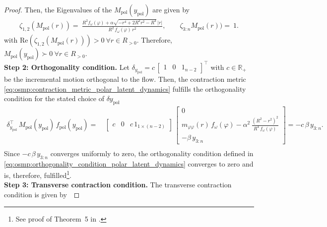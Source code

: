 \begin{proof}
    Then, the Eigenvalues of the $M_\mathrm{pol}(y_\mathrm{pol})$ are given by
    \begin{equation}
    \begin{split}
        \zeta_{1,2}(M_\mathrm{pol}(r)) =  \: \frac{R^2 f_\omega(\varphi) + \alpha \sqrt{- r^4 + 2R^2 r^2 -R^4 } \, |r|}{R^2 \, f_\omega(\varphi) \, r^2},
        \qquad
        \zeta_{3:n}M_\mathrm{pol}(r)) = \: 1.
    \end{split}
    \end{equation}
    with $\mathrm{Re}(\zeta_{1,2}(M_\mathrm{pol}(r))) > 0 \: \forall r \in R_{>0}$. Therefore, $M_\mathrm{pol}(y_\mathrm{pol}) \succ 0 \: \forall r \in R_{>0}$.
    \\
    \textbf{Step 2: Orthogonality condition.}
    Let $\delta_{y_\mathrm{pol}} = c \, \begin{bmatrix}
        1 & 0 & 1_{n-2}
    \end{bmatrix}^\top$ with $c \in \mathbb{R}_+$ be the incremental motion orthogonal to the flow. Then, the contraction metric \eqref{eq:osmp:contraction_metric_polar_latent_dynamics} fulfills the orthogonality condition for the stated choice of $\delta y_\mathrm{pol}$~\citep{manchester2014transverse}
    \begin{equation}\label{eq:osmp:orthogonality_condition_polar_latent_dynamics}
    \begin{split}
        \delta_{y_\mathrm{pol}}^\top \, M_\mathrm{pol}(y_\mathrm{pol}) \, f_\mathrm{pol}(y_\mathrm{pol}) = & \: \begin{bmatrix}
            c & 0 & c \, 1_{1 \times (n-2)}
        \end{bmatrix} \, \begin{bmatrix}
            0\\
            m_{\varphi \varphi}(r) \, f_\omega(\varphi) - \alpha^2 \, \frac{(R^2 - r^2)^2}{R^4 \, f_\omega(\varphi)}\\
            -\beta \, y_{3:n}
        \end{bmatrix} = -c \, \beta \, y_{3:n}.\\
    \end{split}
    \end{equation}
    Since $-c \, \beta \, y_{3:n}$ converges uniformly to zero, the orthogonality condition defined in \eqref{eq:osmp:orthogonality_condition_polar_latent_dynamics} converges to zero and is, therefore, fulfilled\footnote{See proof of Theorem~5 in \citep{manchester2014transverse}.}.\\
    \textbf{Step 3: Transverse contraction condition.} The transverse contraction condition is given by~\citep{manchester2014transverse}

\end{proof}
